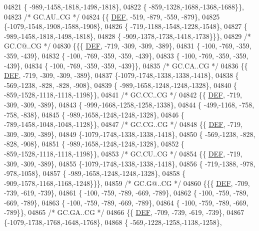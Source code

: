 \begin{DoxyCode}
04821 \{ -989,-1458,-1818,-1498,-1818\},
04822 \{ -859,-1328,-1688,-1368,-1688\}\},
04823 \textcolor{comment}{/* GC.AU..CG */}
04824 \{\{  \mbox{\hyperlink{1_88_84__epars_8h_a397419fc12b37ed479c8abb9d444d843}{DEF}}, -519, -879, -559, -879\},
04825 \{-1079,-1548,-1908,-1588,-1908\},
04826 \{ -719,-1188,-1548,-1228,-1548\},
04827 \{ -989,-1458,-1818,-1498,-1818\},
04828 \{ -909,-1378,-1738,-1418,-1738\}\}\},
04829 \textcolor{comment}{/* GC.C@..CG */}
04830 \{\{\{  \mbox{\hyperlink{1_88_84__epars_8h_a397419fc12b37ed479c8abb9d444d843}{DEF}}, -719, -309, -309, -389\},
04831 \{ -100, -769, -359, -359, -439\},
04832 \{ -100, -769, -359, -359, -439\},
04833 \{ -100, -769, -359, -359, -439\},
04834 \{ -100, -769, -359, -359, -439\}\},
04835 \textcolor{comment}{/* GC.CA..CG */}
04836 \{\{  \mbox{\hyperlink{1_88_84__epars_8h_a397419fc12b37ed479c8abb9d444d843}{DEF}}, -719, -309, -309, -389\},
04837 \{-1079,-1748,-1338,-1338,-1418\},
04838 \{ -569,-1238, -828, -828, -908\},
04839 \{ -989,-1658,-1248,-1248,-1328\},
04840 \{ -859,-1528,-1118,-1118,-1198\}\},
04841 \textcolor{comment}{/* GC.CC..CG */}
04842 \{\{  \mbox{\hyperlink{1_88_84__epars_8h_a397419fc12b37ed479c8abb9d444d843}{DEF}}, -719, -309, -309, -389\},
04843 \{ -999,-1668,-1258,-1258,-1338\},
04844 \{ -499,-1168, -758, -758, -838\},
04845 \{ -989,-1658,-1248,-1248,-1328\},
04846 \{ -789,-1458,-1048,-1048,-1128\}\},
04847 \textcolor{comment}{/* GC.CG..CG */}
04848 \{\{  \mbox{\hyperlink{1_88_84__epars_8h_a397419fc12b37ed479c8abb9d444d843}{DEF}}, -719, -309, -309, -389\},
04849 \{-1079,-1748,-1338,-1338,-1418\},
04850 \{ -569,-1238, -828, -828, -908\},
04851 \{ -989,-1658,-1248,-1248,-1328\},
04852 \{ -859,-1528,-1118,-1118,-1198\}\},
04853 \textcolor{comment}{/* GC.CU..CG */}
04854 \{\{  \mbox{\hyperlink{1_88_84__epars_8h_a397419fc12b37ed479c8abb9d444d843}{DEF}}, -719, -309, -309, -389\},
04855 \{-1079,-1748,-1338,-1338,-1418\},
04856 \{ -719,-1388, -978, -978,-1058\},
04857 \{ -989,-1658,-1248,-1248,-1328\},
04858 \{ -909,-1578,-1168,-1168,-1248\}\}\},
04859 \textcolor{comment}{/* GC.G@..CG */}
04860 \{\{\{  \mbox{\hyperlink{1_88_84__epars_8h_a397419fc12b37ed479c8abb9d444d843}{DEF}}, -709, -739, -619, -739\},
04861 \{ -100, -759, -789, -669, -789\},
04862 \{ -100, -759, -789, -669, -789\},
04863 \{ -100, -759, -789, -669, -789\},
04864 \{ -100, -759, -789, -669, -789\}\},
04865 \textcolor{comment}{/* GC.GA..CG */}
04866 \{\{  \mbox{\hyperlink{1_88_84__epars_8h_a397419fc12b37ed479c8abb9d444d843}{DEF}}, -709, -739, -619, -739\},
04867 \{-1079,-1738,-1768,-1648,-1768\},
04868 \{ -569,-1228,-1258,-1138,-1258\},

\end{DoxyCode}
